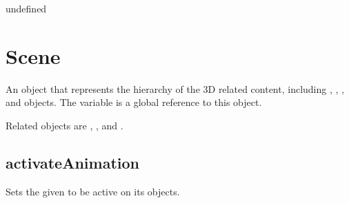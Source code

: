 \documentclass[letterpaper,12pt,english,openany,oneside]{sphinxmanual}
\begin{document}
\label{\detokenize{JS_3D_API:syntax-99}}

\begin{sphinxVerbatim}[commandchars=\\\{\}]
  
\end{sphinxVerbatim}
\label{\detokenize{JS_3D_API:parameters-73}}

\label{\detokenize{JS_3D_API:section-101}}\label{\detokenize{JS_3D_API:returns-100}}

undefined


\section{Scene}
\label{\detokenize{JS_3D_API:scene}}
An object that represents the hierarchy of the 3D related content, including  ,  ,  , and  objects. The variable  is a global reference to this object.

Related objects are , ,  and .

\label{\detokenize{JS_3D_API:properties-25}}


\subsection{activateAnimation}
\label{\detokenize{JS_3D_API:activateanimation}}
Sets the given  to be active on its  objects.

\label{\detokenize{JS_3D_API:syntax-100}}

\begin{sphinxVerbatim}[commandchars=\\\{\}]
\end{sphinxVerbatim}
\label{\detokenize{JS_3D_API:parameters-74}}
\end{document}
